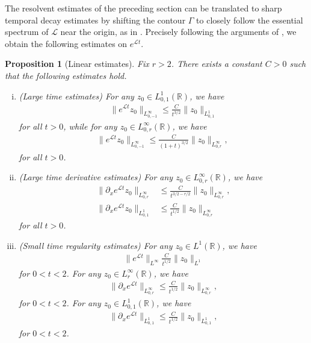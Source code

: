 \documentclass[11pt]{article}
\newcommand{\R}{\mathbb{R}}
\newcommand{\mcl}{\mathcal{L}}
\newtheorem{prop}{Proposition}
\numberwithin{equation}{section}
\numberwithin{prop}{section}
\begin{document}
The resolvent estimates of the preceding section can be translated to sharp temporal decay estimates by shifting the contour $\Gamma$ to closely follow the essential spectrum of $\mcl$ near the origin, as in \cite{CAMS, SIMA}. Precisely following the arguments of \cite[Section 4]{CAMS}, we obtain the following estimates on $e^{\mcl t}$. 

\begin{prop}[Linear estimates]\label{p: linear estimates}
	Fix $r > 2$. There exists a constant $C > 0$ such that the following estimates hold.
	\begin{enumerate}[i.]
		\item (Large time estimates) For any $z_0 \in L^1_{0,1} (\R)$, we have
		\begin{align}
			\| e^{\mcl t } z_0 \|_{L^\infty_{0, -1}} \leq \frac{C}{t^{3/2}} \| z_0 \|_{L^1_{0,1}}
		\end{align}
		for all $t > 0$, while for any $z_0 \in L^\infty_{0,r}(\R)$, we have
		\begin{align}
			\| e^{\mcl t } z_0 \|_{L^\infty_{0, -1}} \leq \frac{C}{(1+t)^{3/2}} \| z_0 \|_{L^\infty_{0,r}}, \
		\end{align}
		for all $t > 0$. 
		\item (Large time derivative estimates) For any $z_0 \in L^\infty_{0,r}(\R)$, we have
		\begin{align}
			\| \partial_x e^{\mcl t} z_0 \|_{L^\infty_{0, r}} &\leq \frac{C}{t^{3/2-r/2}} \| z_0 \|_{L^\infty_{0, r}}, \\
			\| \partial_x e^{\mcl t} z_0 \|_{L^1_{0,1}} &\leq \frac{C}{t^{1/2}} \| z_0 \|_{L^\infty_{0, r}}
		\end{align}
		for all $t > 0$. 
		\item (Small time regularity estimates) For any $z_0 \in L^1(\R)$, we have
		\begin{align}
			\| e^{\mcl t} \|_{L^\infty} \frac{C}{t^{1/2}} \| z_0 \|_{L^1} 
		\end{align}
		for $0 < t < 2$. For any $z_0 \in L^\infty_r(\R)$, we have
		\begin{align}
			\| \partial_x e^{\mcl t} \|_{L^\infty_{0,r}} \leq \frac{C}{t^{1/2}} \| z_0 \|_{L^\infty_{0, r}}, 
		\end{align}
		for $0 < t < 2$. For any $z_0 \in L^1_{0,1} (\R)$, we have
		\begin{align}
					\| \partial_x e^{\mcl t} \|_{L^1_{0,1}} \leq \frac{C}{t^{1/2}} \| z_0 \|_{L^1_{0, 1}}, 
		\end{align}
		for $0 < t < 2$. 
	\end{enumerate}
\end{prop}
\end{document}
